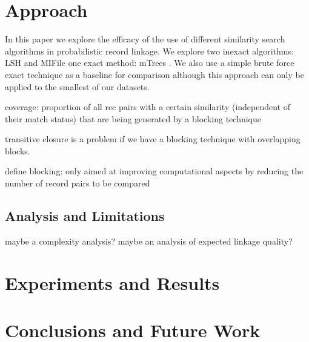 \documentclass{llncs}
\begin{document}


\section{Approach}
\label{sec-approach}

In this paper we explore the efficacy of the use of different similarity search algorithms in probabilistic record linkage. We explore two inexact algorithms: LSH and MIFile \cite{amato2014mi} one exact method: mTrees \cite{paolociaccia2m}. We also use a simple brute force exact technique as a baseline for comparison although this approach can only be applied to the smallest of our datasets.

coverage: proportion of all rec pairs with a certain similarity
(independent of their match status) that are being generated by
a blocking  technique

transitive closure is a problem if we have a blocking technique with overlapping blocks.

define blocking: only aimed at improving computational aspects by reducing the number of record pairs to be compared










\subsection{Analysis and Limitations}
\label{sec-analysis}

maybe a complexity analysis? maybe an analysis of expected 
linkage quality?


\section{Experiments and Results}
\label{sec-data}



\section{Conclusions and Future Work}
\label{sec-concl}



 
\end{document}
